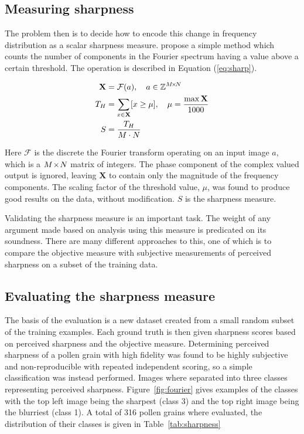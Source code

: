 \subsection{Measuring sharpness}
The problem then is to decide how to encode this change in frequency distribution as a scalar sharpness measure.
\citeauthor{de2013image} propose a simple method which counts the number of components in the Fourier spectrum having a value above a certain threshold.
The operation is described in Equation (\ref{eq:sharp}).


\begin{equation}\label{eq:sharp}
  \begin{split}
    \mathbf{X} &= \mathcal{F}(a),\quad a\in \mathbb{Z}^{M\!\times \! N}\\
    T_H &= \sum_{x\in\mathbf{X}}[x\ge\mu],\quad \mu=\frac{\max \mathbf{X}}{1000}\\
    S &= \dfrac{T_H}{M\cdot N}
  \end{split}
\end{equation}

Here \(\mathcal{F}\) is the discrete the Fourier transform operating on an input image \(a\), which is a \(M\!\times \! N\) matrix of integers.
The phase component of the complex valued output is ignored, leaving \(\mathbf{X}\) to contain only the magnitude of the frequency components.
The scaling factor of the threshold value, \(\mu \), was found to produce good results on the data, without modification. \(S\) is the sharpness measure.

Validating the sharpness measure is an important task.
The weight of any argument made based on analysis using this measure is predicated on its soundness.
There are many different approaches to this, one of which is to compare the objective measure with subjective measurements of perceived sharpness on a subset of the training data.

\subsection{Evaluating the sharpness measure}
The basis of the evaluation is a new dataset created from a small random subset of the training examples.
Each ground truth is then given sharpness scores based on perceived sharpness and the objective measure.
Determining perceived sharpness of a pollen grain with high fidelity was found to be highly subjective and non-reproducible with repeated independent scoring, so a simple classification was instead performed.
Images where separated into three classes representing perceived sharpness.
Figure~\ref{fig:fourier} gives examples of the classes with the top left image being the sharpest (class 3) and the top right image being the blurriest (class 1).
A total of 316 pollen grains where evaluated, the distribution of their classes is given in Table~\ref{tab:sharpness}

